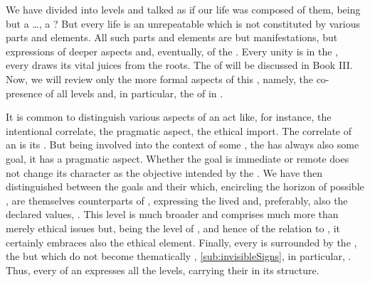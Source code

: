 %
We have divided  into levels and talked as if our life was
composed of them, being but a \ldots {}, a ? But every
life is an unrepeatable  which is not constituted by various parts and
elements. All such parts and elements are but manifestations, but 
expressions of deeper aspects and, eventually, of the . Every
 unity is  in the , every
 draws its vital juices from the  roots. The
 of  will be discussed in Book III. Now, we
will review only the more formal aspects of this , namely, the 
co-presence of all levels and, in particular,  the  of
 in . 

\label{sub:mit}%


\pa\label{rest} %
It is common to distinguish various aspects of an act like, for instance, the
intentional correlate, the pragmatic aspect, the ethical import. The
 correlate of an  is its .  But being involved
into the context of some , the  has always also some goal, it
has a pragmatic aspect. Whether the goal is immediate or remote does not change
its character as the  objective intended by the . We have
then distinguished between the  goals and their 
which, encircling the horizon of possible , are themselves
counterparts of , expressing the lived and, preferably, also the
declared values, . This level is much broader and comprises much
more than merely ethical issues but, being the level of , and hence
of the relation to , it certainly embraces also the ethical
element. Finally, every  is surrounded by the , 
the  but  which do not become thematically
, \ref{sub:invisibleSigns}, in particular, .
Thus, every  of an  expresses all the levels, carrying
their  in its structure.

